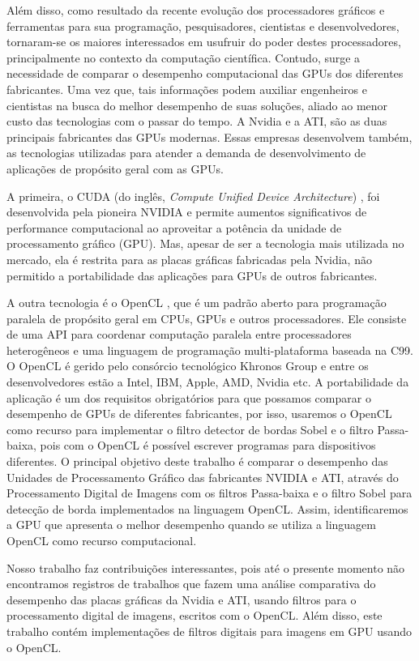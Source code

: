 Além disso, como resultado da recente evolução dos processadores gráficos e ferramentas para sua programação, pesquisadores, cientistas e desenvolvedores, tornaram-se os maiores interessados em usufruir  do poder destes processadores, principalmente no contexto da computação científica. Contudo, surge a necessidade de comparar o desempenho computacional das GPUs dos diferentes fabricantes. Uma vez que, tais informações podem auxiliar engenheiros e cientistas na busca do melhor desempenho de suas soluções, aliado ao menor custo das tecnologias com o passar do tempo. A Nvidia e a ATI, são as duas principais fabricantes das GPUs modernas. Essas empresas desenvolvem também, as tecnologias utilizadas  para  atender a demanda de desenvolvimento de aplicações de propósito geral com as GPUs. 

A primeira, o CUDA (do inglês, \textit{Compute Unified Device Architecture}) \cite{NvidiaCuda}, foi desenvolvida pela pioneira NVIDIA e permite aumentos significativos de performance computacional ao aproveitar a potência da unidade de processamento gráfico (GPU). Mas, apesar de ser a tecnologia mais utilizada no mercado, ela é restrita para as placas gráficas fabricadas pela Nvidia, não permitido a portabilidade das aplicações para GPUs de outros fabricantes.

A outra tecnologia é o OpenCL \cite{opencl08}, que é um padrão aberto para programação paralela de propósito geral em CPUs, GPUs e outros processadores. Ele consiste de uma API para coordenar computação paralela entre processadores heterogêneos e uma linguagem de programação multi-plataforma baseada na C99.  O OpenCL é gerido pelo consórcio tecnológico Khronos Group e  entre os desenvolvedores estão a Intel, IBM, Apple, AMD, Nvidia etc. A  portabilidade da aplicação é um dos requisitos obrigatórios para que possamos  comparar o desempenho  de  GPUs de diferentes fabricantes, por isso, usaremos  o OpenCL como recurso para implementar o filtro detector de bordas Sobel e o filtro Passa-baixa, pois com o OpenCL é  possível escrever programas para dispositivos diferentes. O principal objetivo deste trabalho é comparar o desempenho das Unidades de Processamento Gráfico das fabricantes NVIDIA e ATI, através do Processamento Digital de Imagens com os filtros Passa-baixa e o filtro Sobel para detecção de borda implementados na linguagem OpenCL. Assim, identificaremos a GPU que apresenta o melhor desempenho quando se utiliza  a linguagem OpenCL como recurso computacional. 

Nosso trabalho faz contribuições interessantes, pois até o presente momento não encontramos registros de trabalhos que fazem uma análise comparativa do desempenho das placas gráficas da Nvidia e ATI, usando filtros para o processamento digital de imagens, escritos com o OpenCL. Além disso, este trabalho contém implementações de filtros digitais para imagens em GPU usando o OpenCL.

